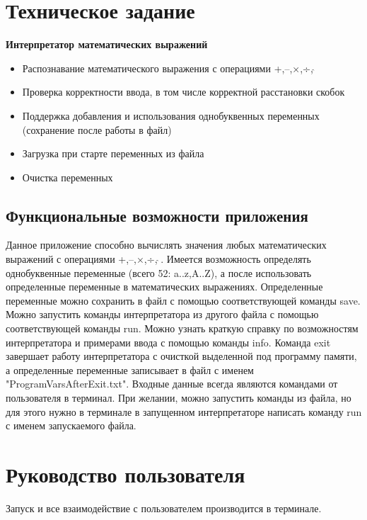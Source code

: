 \documentclass[a4paper,14pt]{extarticle}
\begin{document}

\newpage

\tableofcontents
\newpage

\section{Техническое задание}
\textbf{Интерпретатор математических выражений}
\begin{itemize}
	\item Распознавание математического выражения с операциями +,–,×,÷,\,{$\hat{} $}
	
	\item Проверка корректности ввода, в том числе корректной расстановки скобок
	
	\item Поддержка добавления и использования однобуквенных переменных (сохранение после работы в файл)
	
	\item Загрузка при старте переменных из файла
	
	\item Очистка переменных
\end{itemize}

\subsection{Функциональные возможности приложения}
Данное приложение способно вычислять значения любых математических выражений с операциями +,–,×,÷,\,{$\hat{} $}\,{.}  
Имеется возможность определять однобуквенные переменные (всего 52: a..z,A..Z), а после использовать
определенные переменные в математических выражениях.
Определенные переменные можно сохранить в файл с помощью соответствующей команды save.
Можно запустить команды интерпретатора из другого файла с помощью соответствующей команды run.
Можно узнать краткую справку по возможностям интерпретатора и примерами ввода с помощью команды info.
Команда exit завершает работу интерпретатора с очисткой выделенной под программу памяти, а
определенные переменные записывает в файл с именем "ProgramVarsAfterExit.txt".
Входные данные всегда являются командами от пользователя в терминал.
При желании, можно запустить команды из файла, но для этого нужно в терминале
в запущенном интерпретаторе написать команду run с именем запускаемого файла.


\section{Руководство пользователя}
Запуск и все взаимодействие с пользователем производится в терминале.
 
\end{document}
